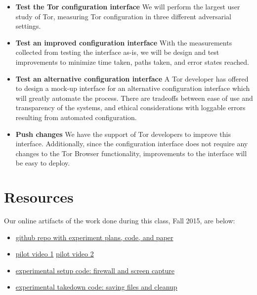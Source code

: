 \documentclass{template}
\begin{document}
\begin{itemize} \itemsep1pt \parskip0pt 
\item {\bfseries Test the Tor configuration interface} We will perform the largest user study 
of Tor, measuring Tor configuration in three different adversarial settings. 
\item {\bfseries Test an improved configuration interface} With the measurements collected
from testing the interface as-is, we will be design and test improvements to minimize
time taken, paths taken, and error states reached.
\item {\bfseries Test an alternative configuration interface} A Tor developer has offered
to design a mock-up interface for an alternative configuration interface which will
greatly automate the process. There are tradeoffs between ease of use and transparency
of the systems, and ethical considerations with loggable errors resulting from automated configuration. 
\item {\bfseries Push changes} We have the support of Tor developers
to improve this interface. Additionally, since the configuration interface does not require 
any changes to the Tor Browser functionality, improvements to the interface will
be easy to deploy. 
\end{itemize}

\section{Resources}
\noindent Our online artifacts of the work done during this class, Fall 2015,
are below: 
\begin{itemize} \itemsep1pt \parskip0pt 
\item \href{https://github.com/lindanlee/circumvention-ux-tor}{github repo with experiment plans, code, and paper}
\item \href {https://github.com/lindanlee/circumvention-ux-tor/blob/master/pilot/1-strict.mp4}{pilot video 1}
	\href{https://github.com/lindanlee/circumvention-ux-tor/blob/master/pilot/2-lax.mp4}{pilot video 2}
\item \href{https://github.com/lindanlee/circumvention-ux-tor/blob/master/setup/setup-environment}{experimental setup code: firewall and screen capture} 
\item \href{https://github.com/lindanlee/circumvention-ux-tor/blob/master/setup/takedown-environment}{experimental takedown code: saving files and cleanup} 
\end{itemize}
\end{document}
